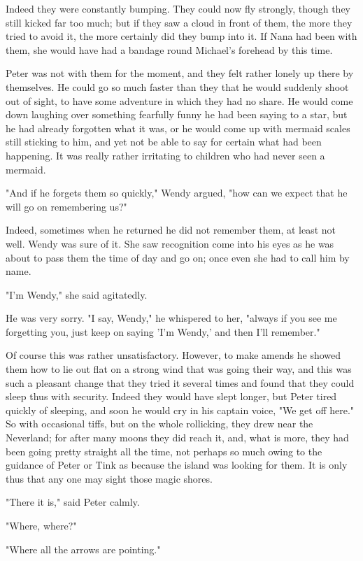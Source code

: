 Indeed they were constantly bumping. They could now fly strongly, though
they still kicked far too much; but if they saw a cloud in front of them,
the more they tried to avoid it, the more certainly did they bump into it.
If Nana had been with them, she would have had a bandage round Michael's
forehead by this time.


Peter was not with them for the moment, and they felt rather lonely up
there by themselves. He could go so much faster than they that he would
suddenly shoot out of sight, to have some adventure in which they had no
share. He would come down laughing over something fearfully funny he had
been saying to a star, but he had already forgotten what it was, or he
would come up with mermaid scales still sticking to him, and yet not be
able to say for certain what had been happening. It was really rather
irritating to children who had never seen a mermaid.


"And if he forgets them so quickly," Wendy argued, "how can we expect that
he will go on remembering us?"


Indeed, sometimes when he returned he did not remember them, at least not
well. Wendy was sure of it. She saw recognition come into his eyes as he
was about to pass them the time of day and go on; once even she had to
call him by name.


"I'm Wendy," she said agitatedly.


He was very sorry. "I say, Wendy," he whispered to her, "always if you see
me forgetting you, just keep on saying 'I'm Wendy,' and then I'll
remember."


Of course this was rather unsatisfactory. However, to make amends he
showed them how to lie out flat on a strong wind that was going their way,
and this was such a pleasant change that they tried it several times and
found that they could sleep thus with security. Indeed they would have
slept longer, but Peter tired quickly of sleeping, and soon he would cry
in his captain voice, "We get off here." So with occasional tiffs, but on
the whole rollicking, they drew near the Neverland; for after many moons
they did reach it, and, what is more, they had been going pretty straight
all the time, not perhaps so much owing to the guidance of Peter or Tink
as because the island was looking for them. It is only thus that any one
may sight those magic shores.


"There it is," said Peter calmly.


"Where, where?"


"Where all the arrows are pointing."


